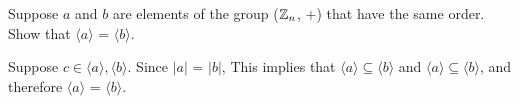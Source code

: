 
\begin{question}{2}
Suppose $a$ and $b$ are elements of the group ($\mathbb{Z}_n$, +) that have the same order. Show
that $\langle a \rangle$ = $\langle b \rangle$.

Suppose $c \in \langle a \rangle, \langle b \rangle$. Since $|a|$ = $|b|$, This implies that $\langle a \rangle \subseteq \langle b \rangle$ and $\langle a \rangle \subseteq \langle b \rangle$, and therefore $\langle a \rangle$ = $\langle b \rangle$.

\end{question}

